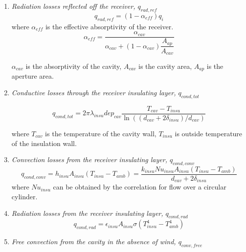 \begin{enumerate}[label=(\arabic*)]
  \item \emph{Radiation losses reflected off the receiver, $q_{rad,ref}$}
  \begin{equation}
    q_{rad,ref}=(1-\alpha_{eff})q_{i}
\end{equation}
    where $\alpha_{eff}$ is the effective absorptivity of the receiver.    
    \begin{equation}
    \alpha_{eff}=\frac{\alpha_{cav}}{\alpha_{cav}+(1-\alpha_{cav})\dfrac{A_{ap}}{A_{cav}}}
    \end{equation}
    
    $\alpha_{cav}$ is the absorptivity of the cavity, $A_{cav}$ is the cavity area, $A_{ap}$ is the aperture area.
  \item \emph{Conductive losses through the receiver insulating layer, $q_{cond,tot}$}
  
  \begin{equation}
q_{cond,tot}=2\pi\lambda_{insu}dep_{cav}\dfrac{T_{cav}-T_{insu}}{\ln((d_{cav}+2\delta_{insu})/d_{cav})}
    \end{equation}
    
    where $T_{cav}$ is the temperature of the cavity wall, $T_{insu}$
is outside temperature of the insulation wall.

  \item \emph{Convection losses from the receiver insulating layer, $q_{cond,conv}$}  
  \begin{equation}
	q_{cond,conv}=h_{insu}A_{insu}(T_{insu}-T_{amb})
	=\dfrac{k_{insu}Nu_{insu}A_{insu}(T_{insu}-T_{amb})}{d_{cav}+2\delta_{insu}}
\end{equation}
where $Nu_{insu}$ can be obtained by the correlation for flow over a circular cylinder.~\cite{Churchill1977}

  \item \emph{Radiation losses from the receiver insulating layer, $q_{cond,rad}$}  
  \begin{equation}
	q_{cond,rad}=\epsilon_{insu}A_{insu}\sigma(T_{insu}^4 - T_{amb}^4)
\end{equation}
  \item \emph{Free convection from the cavity in the absence of wind, $q_{conv,free}$}
    

\end{enumerate}
